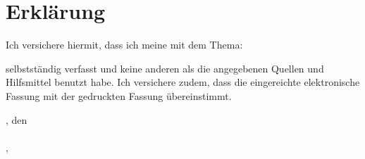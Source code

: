\chapter*{Erklärung}
	Ich versichere hiermit, dass ich meine \arbeit{} mit dem Thema:
	\begin{quote}
		\textit{\titel}
	\end{quote}
	selbstständig verfasst und keine anderen als die angegebenen Quellen und Hilfsmittel benutzt habe. Ich versichere zudem, dass die eingereichte elektronische Fassung mit der gedruckten Fassung übereinstimmt. 
	\vspace{1cm}
	
	\abgabeOrt, den \abgabeDatum \\[0.5cm]
	{\makebox[6cm]{\hrulefill}}\\ 
	\nachname , \vorname
